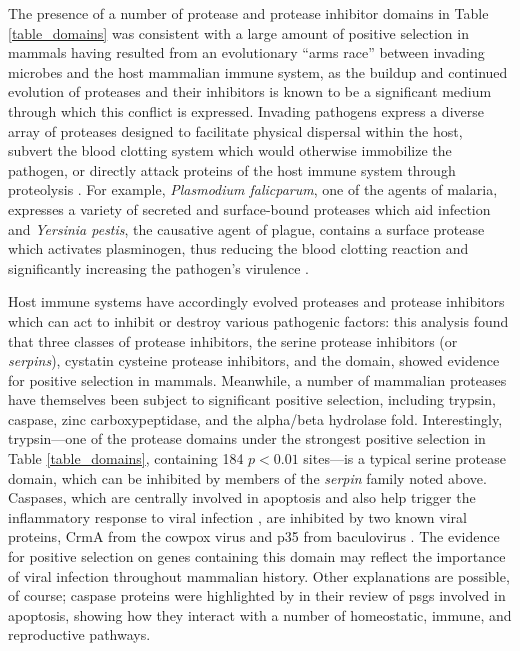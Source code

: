 The presence of a number of protease and protease inhibitor domains in
Table \ref{table_domains} was consistent with a large amount of
positive selection in mammals having resulted from an evolutionary
``arms race'' between invading microbes and the host mammalian immune
system, as the buildup and continued evolution of proteases and their
inhibitors is known to be a significant medium through which this
conflict is expressed. Invading pathogens express a diverse array of
proteases designed to facilitate physical dispersal within the host,
subvert the blood clotting system which would otherwise immobilize the
pathogen, or directly attack proteins of the host immune system
through proteolysis \citep{Armstrong2006}. For example,
\emph{Plasmodium falicparum}, one of the agents of malaria, expresses
a variety of secreted and surface-bound proteases which aid infection
\citep{McKerrow1993} and \emph{Yersinia pestis}, the causative agent
of plague, contains a surface protease which activates plasminogen,
thus reducing the blood clotting reaction and significantly increasing
the pathogen's virulence \citep{Sodeinde1992}.

Host immune systems have accordingly evolved proteases and protease
inhibitors which can act to inhibit or destroy various pathogenic
factors: this analysis found that three classes of protease
inhibitors, the serine protease inhibitors (or \emph{serpins}),
cystatin cysteine protease inhibitors, and the \amac domain, showed
evidence for positive selection in mammals. Meanwhile, a number of
mammalian proteases have themselves been subject to significant
positive selection, including trypsin, caspase, zinc carboxypeptidase,
and the alpha/beta hydrolase fold. Interestingly, trypsin---one of the
protease domains under the strongest positive selection in Table
\ref{table_domains}, containing 184 $p<0.01$ sites---is a typical
serine protease domain, which can be inhibited by members of the
\emph{serpin} family noted above. Caspases, which are centrally
involved in apoptosis and also help trigger the inflammatory response
to viral infection \citep{Nicholson1997}, are inhibited by two known
viral proteins, CrmA from the cowpox virus and p35 from baculovirus
\citep{Villa1997}. The evidence for positive selection on genes
containing this domain may reflect the importance of viral infection
throughout mammalian history. Other explanations are possible, of
course; caspase proteins were highlighted by \citet{Fonseca2010} in
their review of \acp{psg} involved in apoptosis, showing how they
interact with a number of homeostatic, immune, and reproductive
pathways.

